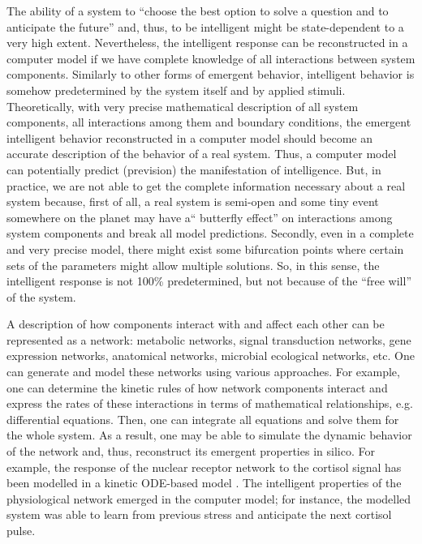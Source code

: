 The ability of a system to ``choose the best option to solve a question and to anticipate the future'' and, thus, to be intelligent might be state-dependent to a very high extent. Nevertheless, the intelligent response can be reconstructed in a computer model if we have complete knowledge of all interactions between system components. Similarly to other forms of emergent behavior, intelligent behavior is somehow predetermined by the system itself and by applied stimuli. Theoretically, with very precise mathematical description of all system components, all interactions among them and boundary conditions, the emergent intelligent behavior reconstructed in a computer model should become an accurate description of the behavior of a real system. Thus, a computer model can potentially predict (prevision) the manifestation of intelligence. But, in practice, we are not able to get the complete information necessary about a real system because, first of all, a real system is semi-open and some tiny event somewhere on the planet may have a`` butterfly effect'' on interactions among system components and break all model predictions. Secondly, even in a complete and very precise model, there might exist some bifurcation points where certain sets of the parameters might allow multiple solutions. So, in this sense, the intelligent response is not 100\% predetermined, but not because of the ``free will'' of the system.

A description of how components interact with and affect each other can be represented as a network: metabolic networks, signal transduction networks, gene expression networks, anatomical networks, microbial ecological networks, etc. One can generate and model these networks using various approaches. For example, one can determine the kinetic rules of how network components interact and express the rates of these interactions in terms of mathematical relationships, e.g. differential equations. Then, one can integrate all equations and solve them for the whole system. As a result, one may be able to simulate the dynamic behavior of the network and, thus, reconstruct its emergent properties in silico. For example, the response of the nuclear receptor network to the cortisol signal has been modelled in a kinetic ODE-based model \cite{kolodkin_computing_2013}. The intelligent properties of the physiological network emerged in the computer model; for instance, the modelled system was able to learn from previous stress and anticipate the next cortisol pulse.


